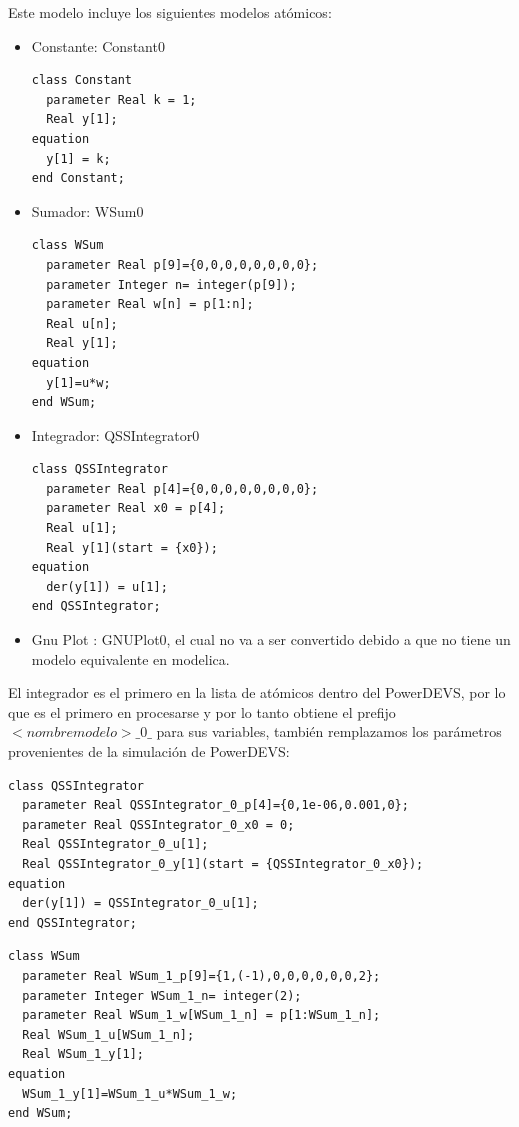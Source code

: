 Este modelo incluye los siguientes modelos atómicos:
\begin{itemize}
        \item Constante: Constant0
\begin{verbatim}        
class Constant
  parameter Real k = 1;
  Real y[1];
equation
  y[1] = k;
end Constant;
\end{verbatim}

        \item Sumador: WSum0
\begin{verbatim}        
class WSum
  parameter Real p[9]={0,0,0,0,0,0,0,0};
  parameter Integer n= integer(p[9]);
  parameter Real w[n] = p[1:n];
  Real u[n];
  Real y[1];
equation
  y[1]=u*w;
end WSum;
\end{verbatim}

        \item Integrador: QSSIntegrator0
\begin{verbatim}        
class QSSIntegrator
  parameter Real p[4]={0,0,0,0,0,0,0,0};
  parameter Real x0 = p[4];
  Real u[1];
  Real y[1](start = {x0});
equation
  der(y[1]) = u[1];
end QSSIntegrator;
\end{verbatim}

        \item Gnu Plot : GNUPlot0, el cual no va a ser convertido debido a que no tiene un modelo equivalente en modelica.
\end{itemize}

El integrador es el primero en la lista de atómicos dentro del PowerDEVS, por lo que es el primero en procesarse y por lo tanto obtiene el 
	prefijo $<nombre modelo>\_0\_$ para sus variables, también remplazamos los parámetros provenientes de la simulación de PowerDEVS:

\begin{verbatim}        
class QSSIntegrator
  parameter Real QSSIntegrator_0_p[4]={0,1e-06,0.001,0};
  parameter Real QSSIntegrator_0_x0 = 0;
  Real QSSIntegrator_0_u[1];
  Real QSSIntegrator_0_y[1](start = {QSSIntegrator_0_x0});
equation
  der(y[1]) = QSSIntegrator_0_u[1];
end QSSIntegrator;
\end{verbatim}

\begin{verbatim}
class WSum
  parameter Real WSum_1_p[9]={1,(-1),0,0,0,0,0,0,2};
  parameter Integer WSum_1_n= integer(2);
  parameter Real WSum_1_w[WSum_1_n] = p[1:WSum_1_n];
  Real WSum_1_u[WSum_1_n];
  Real WSum_1_y[1];
equation
  WSum_1_y[1]=WSum_1_u*WSum_1_w;
end WSum;
\end{verbatim}

